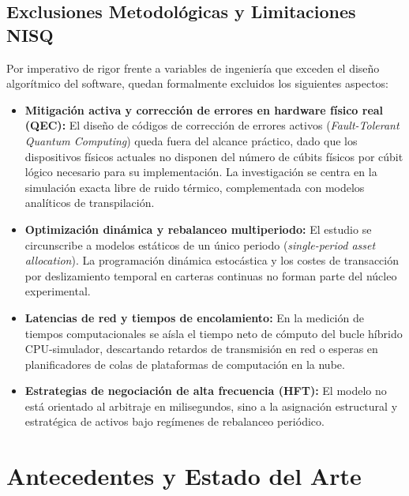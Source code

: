 \subsection{Exclusiones Metodológicas y Limitaciones NISQ}
\label{subsec:exclusiones_metodologicas}

Por imperativo de rigor frente a variables de ingeniería que exceden el diseño algorítmico del software, quedan formalmente excluidos los siguientes aspectos:

\begin{itemize}
    \item \textbf{Mitigación activa y corrección de errores en hardware físico real (QEC):} El diseño de códigos de corrección de errores activos (\textit{Fault-Tolerant Quantum Computing}) queda fuera del alcance práctico, dado que los dispositivos físicos actuales no disponen del número de cúbits físicos por cúbit lógico necesario para su implementación. La investigación se centra en la simulación exacta libre de ruido térmico, complementada con modelos analíticos de transpilación.
    
    \item \textbf{Optimización dinámica y rebalanceo multiperiodo:} El estudio se circunscribe a modelos estáticos de un único periodo (\textit{single-period asset allocation}). La programación dinámica estocástica y los costes de transacción por deslizamiento temporal en carteras continuas no forman parte del núcleo experimental.
    
    \item \textbf{Latencias de red y tiempos de encolamiento:} En la medición de tiempos computacionales se aísla el tiempo neto de cómputo del bucle híbrido CPU-simulador, descartando retardos de transmisión en red o esperas en planificadores de colas de plataformas de computación en la nube.
    
    \item \textbf{Estrategias de negociación de alta frecuencia (HFT):} El modelo no está orientado al arbitraje en milisegundos, sino a la asignación estructural y estratégica de activos bajo regímenes de rebalanceo periódico.
\end{itemize}

\section{Antecedentes y Estado del Arte}
\label{sec:antecedentes_estado_arte}

